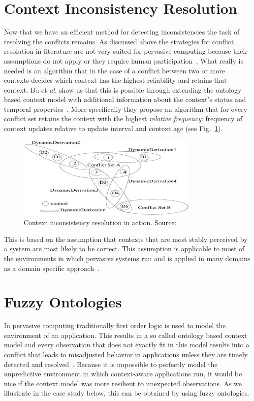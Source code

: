 \documentclass[journal]{vgtc}                %
\begin{document}
\section{Context Inconsistency Resolution}
Now that we have an efficient method for detecting inconsistencies the task of resolving the conflicts remains. As discussed above the strategies for conflict resolution in literature are not very suited for pervasive computing because their assumptions do not apply or they require human participation~\cite{xu:2010:PCC}. What really is needed is an algorithm that in the case of a conflict between two or more contexts decides which context has the highest reliability and retains that context. Bu et \textit{al.} show us that this is possible through extending the ontology based context model with additional information about the context's status and temporal properties~\cite{bu:2006:CCM}. More specifically they propose an algorithm that for every conflict set retains the context with the highest \textit{relative frequency}: frequency of context updates relative to update interval and context age (see Fig.~\ref{fig:cir}). 
\begin{figure}[htb]
  \centering
  \includegraphics[width=3.5in]{cir}
  \caption{Context inconsistency resolution in action. Source:~\cite{bu:2006:CCM}}
  \label{fig:cir}
\end{figure}
This is based on the assumption that contexts that are most stably perceived by a system are most likely to be correct. This assumption is applicable to most of the environments in which pervasive systems run and is applied in many domains as a domain specific approach~\cite{xu:2010:PCC}.

\section{Fuzzy Ontologies}
In pervasive computing traditionally first order logic is used to model the environment of an application. This results in a so called ontology based context model and every observation that does not exactly fit in this model results into a conflict that leads to misadjusted behavior in applications unless they are timely detected and resolved~\cite{xu:2010:PCC}. Because it is impossible to perfectly model the unpredictive environment in which context-aware applications run, it would be nice if the context model was more resilient to unexpected observations. As we illustrate in the case study below, this can be obtained by using fuzzy ontologies.
\end{document}
